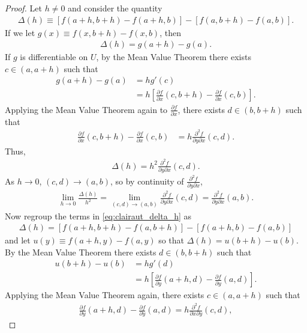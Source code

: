 \documentclass[12pt,letterpaper,reqno]{article}
\numberwithin{equation}{section}
\begin{document}
{\begin{proof}
	Let $h \neq 0$ and consider the quantity
	\begin{align}\label{eq:clairaut_delta_h}
		\Delta(h)\equiv [f(a+h,b+h)-f(a+h,b)]-[f(a,b+h)-f(a,b)].
	\end{align}
	If we let $g(x) \equiv f(x,b+h)-f(x,b)$, then
	\begin{align*}
		\Delta(h)=g(a+h)-g(a).
	\end{align*}
	If $g$ is differentiable on $U$, by the Mean Value Theorem there exists $c \in (a,a+h)$ such that
	\begin{align*}
		g(a+h)-g(a)&=hg'(c) \\
		&=h\left[\frac{\partial f}{\partial x}(c,b+h)-\frac{\partial f}{\partial x}(c,b)\right].
	\end{align*}
	Applying the Mean Value Theorem again to $\frac{\partial f}{\partial x}$, there exists $d \in (b,b+h)$ such that 
	\begin{align*}
		\frac{\partial f}{\partial x}(c,b+h)-\frac{\partial f}{\partial x}(c,b)&=h\frac{\partial^2 f}{\partial y \partial x}(c,d).
	\end{align*}
	Thus,
	\begin{align*}
		\Delta(h)=h^2\frac{\partial^2 f}{\partial y \partial x}(c,d). 
	\end{align*}
	As $h \to 0$, $(c,d) \to (a,b)$, so by continuity of $\frac{\partial^2 f}{\partial y \partial x}$,
	\begin{align*}
		\lim_{h \to 0}\frac{\Delta(h)}{h^2}=\lim_{(c,d) \to (a,b)}\frac{\partial^2 f}{\partial y \partial x}(c,d)=\frac{\partial^2 f}{\partial y \partial x}(a,b).
	\end{align*}
	Now regroup the terms in \eqref{eq:clairaut_delta_h} as 
	\begin{align*}
		\Delta(h)=[f(a+h,b+h)-f(a,b+h)]-[f(a+h,b)-f(a,b)]
	\end{align*}
	and let $u(y)\equiv f(a+h,y)-f(a,y)$ so that $\Delta(h)=u(b+h)-u(b)$. By the Mean Value Theorem there exists $d \in (b,b+h)$ such that 
	\begin{align*}
		u(b+h)-u(b)&=hg'(d) \\
		&=h\left[\frac{\partial f}{\partial y}(a+h,d)-\frac{\partial f}{\partial y}(a,d)\right].
	\end{align*}
	Applying the Mean Value Theorem again, there exists $c \in (a,a+h)$ such that
	\begin{align*}
		\frac{\partial f}{\partial y}(a+h,d)-\frac{\partial f}{\partial y}(a,d)=h\frac{\partial^2 f}{\partial x \partial y}(c,d),

\end{align*}
\end{proof}}
\end{document}
